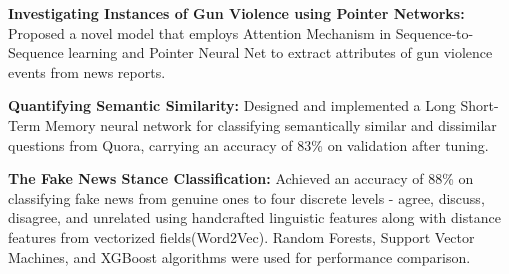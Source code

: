 \vspace{-4mm}
\begin{cventries}
\vspace{-3.5mm}
  \cventry
    {}
    {}
    {}
    {}
    {
      \begin{cvitems}
      \item {{ \textbf{Investigating Instances of Gun Violence using Pointer Networks:} Proposed a novel model that employs Attention Mechanism in Sequence-to-Sequence learning and Pointer Neural Net to extract attributes of gun violence events from news reports.}}
      \item {{ \textbf{Quantifying Semantic Similarity:} Designed and implemented a Long Short-Term Memory neural network for classifying semantically similar and dissimilar questions from Quora, carrying an accuracy of 83\% on validation after tuning.}}
      \item { \textbf{The Fake News Stance Classification:} Achieved an accuracy of 88\% on classifying fake news from genuine ones to four discrete levels - agree, discuss, disagree, and unrelated using handcrafted linguistic features along with distance features from vectorized fields(Word2Vec). Random Forests, Support Vector Machines, and XGBoost algorithms were used for performance comparison.}
      \end{cvitems}
    }
\end{cventries}
